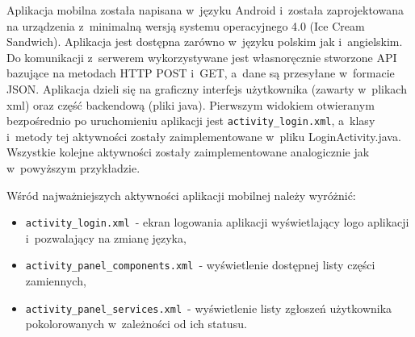 \documentclass[a4paper,11pt]{article}
\begin{document}
Aplikacja mobilna została napisana w~języku Android i~została zaprojektowana na urządzenia z~minimalną wersją systemu operacyjnego 4.0 (Ice Cream Sandwich). Aplikacja jest dostępna zarówno w~języku polskim jak i~angielskim. Do komunikacji z~serwerem wykorzystywane jest własnoręcznie stworzone API bazujące na metodach HTTP POST i~GET, a~dane są przesyłane w~formacie JSON. Aplikacja dzieli się na graficzny interfejs użytkownika (zawarty w~plikach xml) oraz część backendową (pliki java). Pierwszym widokiem otwieranym bezpośrednio po uruchomieniu aplikacji jest \texttt{activity\_login.xml}, a~klasy i~metody tej aktywności zostały zaimplementowane w~pliku LoginActivity.java. Wszystkie kolejne aktywności zostały zaimplementowane analogicznie jak w~powyższym przykładzie.

Wśród najważniejszych aktywności aplikacji mobilnej należy wyróżnić:
\begin{itemize}
	\item \texttt{activity\_login.xml}~- ekran logowania aplikacji  wyświetlający logo aplikacji i~pozwalający na zmianę języka,
	\item \texttt{activity\_panel\_components.xml}~- wyświetlenie dostępnej listy części zamiennych,
	\item \texttt{activity\_panel\_services.xml}~- wyświetlenie listy zgłoszeń użytkownika pokolorowanych w~zależności od ich statusu.
\end{itemize}
\end{document}
